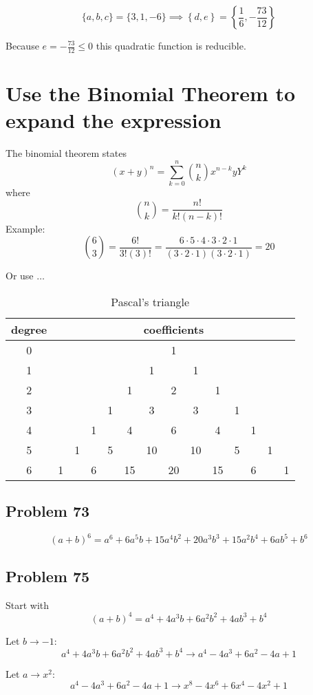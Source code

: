 \documentclass[11pt, oneside]{article}   	%
\begin{document}
$$\{a,b,c\}=\{3, 1, -6\} \implies \left\{d,e\right\} = \left\{\frac{1}{6},-\frac{73}{12}\right\}$$

\noindent Because $e=-\frac{73}{12} \le0$ this quadratic function is reducible.


\section{Use the Binomial Theorem to expand the expression}
The binomial theorem states
$$
(x+y)^{n} = \sum_{k=0}^{n} \binom{n}{k}x^{n-k}yY^{k}
$$
where 
$$
\binom{n}{k} = \frac{n!} {k!(n-k)!}
$$
Example:
$$
\binom{6}{3} = \frac{6!} {3!(3)!} = \frac{6\cdot 5 \cdot 4 \cdot 3\cdot 2 \cdot 1} {(3\cdot 2 \cdot 1)(3\cdot 2 \cdot 1)} = 20
$$

Or use $\dots$
\begin{table}[htp]
\caption{Pascal's triangle}
\begin{center}
\begin{tabular}{cccccccccccccc}
	degree & \multicolumn{13}{c}{coefficients}\\\hline
	0 &&&&&&& 1\\
	1 &&&&&& 1 && 1\\
	2 &&&&& 1 && 2 && 1\\
	3 &&&& 1 && 3 && 3 && 1\\
	4 &&& 1 && 4 && 6 && 4 && 1\\
	5 && 1 && 5 && 10 && 10 && 5 && 1\\
	6 & 1 && 6 && 15 && 20 && 15 && 6 && 1
\end{tabular}
\end{center}
\label{tab:pascal}
\end{table}%

\subsection{Problem 73}
$$(a + b)^6 = a^6 + 6 a^5 b + 15 a^4 b^2 + 20 a^3 b^3 + 15 a^2 b^4 + 6 a b^5 + b^6$$

\subsection{Problem 75}
Start with 
$$(a + b)^4 = a^4 + 4 a^3 b + 6 a^2 b^2 + 4 a b^3 + b^4$$

\noindent Let $b\to-1:$
$$a^4 + 4 a^3 b + 6 a^2 b^2 + 4 a b^3 + b^4 \to a^4-4 a^3+6 a^2-4 a+1$$

\noindent Let $a\to x^2:$
$$a^4-4 a^3+6 a^2-4 a+1 \to x^8-4 x^6+6 x^4-4 x^2+1$$
\end{document}
